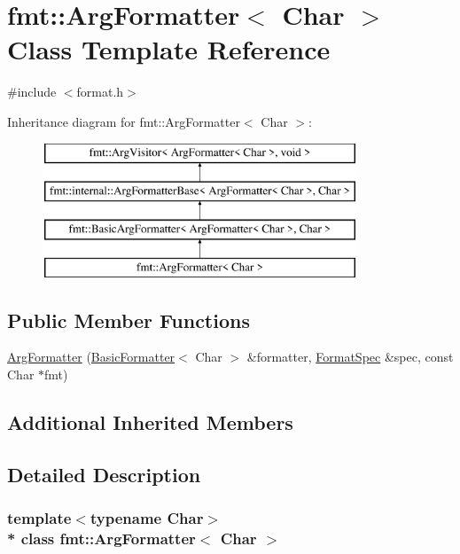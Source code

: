 \hypertarget{classfmt_1_1ArgFormatter}{}\section{fmt\+:\+:Arg\+Formatter$<$ Char $>$ Class Template Reference}
\label{classfmt_1_1ArgFormatter}


{\ttfamily \#include $<$format.\+h$>$}

Inheritance diagram for fmt\+:\+:Arg\+Formatter$<$ Char $>$\+:\begin{figure}[H]
\begin{center}
\leavevmode
\includegraphics[height=4.000000cm]{classfmt_1_1ArgFormatter}
\end{center}
\end{figure}
\subsection*{Public Member Functions}
\begin{DoxyCompactItemize}
\item 
\hyperlink{classfmt_1_1ArgFormatter_a2fc7b9c801f3aa33a8e952df035a140f}{Arg\+Formatter} (\hyperlink{classfmt_1_1BasicFormatter}{Basic\+Formatter}$<$ Char $>$ \&formatter, \hyperlink{structfmt_1_1FormatSpec}{Format\+Spec} \&spec, const Char $\ast$fmt)
\end{DoxyCompactItemize}
\subsection*{Additional Inherited Members}


\subsection{Detailed Description}
\subsubsection*{template$<$typename Char$>$\\*
class fmt\+::\+Arg\+Formatter$<$ Char $>$}

